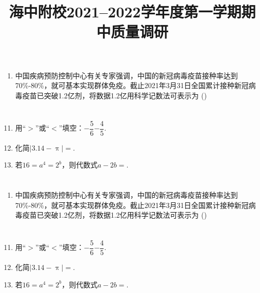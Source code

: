 \documentclass{exam-zh-cn}
\title{海中附校2021--2022学年度第一学期期中质量调研}
\begin{document}
\maketitle
\section{\xzt}
\begin{enumerate}
    \item 中国疾病预防控制中心有关专家强调，中国的新冠病毒疫苗接种率达到70\%-80\%，就可基本实现群体免疫。截止2021年3月31日全国累计接种新冠病毒疫苗已突破1.2亿剂，将数据1.2亿用科学记数法可表示为 (\quad )
\end{enumerate}
\section{\tkt}

\begin{enumerate}
\setcounter{enumi}{10}
\item 用“$>$”或“$<$”填空：$-\dfrac{5}{6}$\tk$-\dfrac{4}{5}$.
\item 化简$|3.14-\uppi|=$\tk .
\item 若$16=a^4=2^b$，则代数式$a-2b=$\tk .
\end{enumerate}
\newpage 
\section{\xzt}
\begin{enumerate}
    \item 中国疾病预防控制中心有关专家强调，中国的新冠病毒疫苗接种率达到70\%-80\%，就可基本实现群体免疫。截止2021年3月31日全国累计接种新冠病毒疫苗已突破1.2亿剂，将数据1.2亿用科学记数法可表示为 (\quad )
\end{enumerate}
\section{\tkt}

\begin{enumerate}
\setcounter{enumi}{10}
\item 用“$>$”或“$<$”填空：$-\dfrac{5}{6}$\tk$-\dfrac{4}{5}$.
\item 化简$|3.14-\uppi|=$\tk .
\item 若$16=a^4=2^b$，则代数式$a-2b=$\tk .
\end{enumerate}
\newpage
\end{document}
